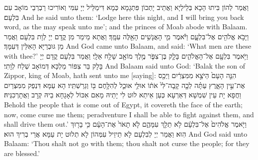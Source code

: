 {וַאֲמַר לְהוֹן בִּיתוּ הָכָא בְּלֵילְיָא וַאֲתֵיב יָתְכוֹן פִּתְגָמָא כְּמָא דִּימַלֵּיל יְיָ עִמִּי וְאוֹרִיכוּ רַבְרְבֵי מוֹאָב עִם בִּלְעָם׃}
{And he said unto them: ‘Lodge here this night, and I will bring you back word, as the \lord\space may speak unto me’; and the princes of Moab abode with Balaam.}{}
{וַיָּבֹ֥א אֱלֹהִ֖ים אֶל־בִּלְעָ֑ם וַיֹּ֕אמֶר מִ֛י הָאֲנָשִׁ֥ים הָאֵ֖לֶּה עִמָּֽךְ׃
}
{וַאֲתָא מֵימַר מִן קֳדָם יְיָ לְוָת בִּלְעָם וַאֲמַר מַן גּוּבְרַיָּא הָאִלֵּין דְּעִמָּךְ׃}
{And God came unto Balaam, and said: ‘What men are these with thee?’}{}
{וַיֹּ֥אמֶר בִּלְעָ֖ם אֶל־הָאֱלֹהִ֑ים בָּלָ֧ק בֶּן־צִפֹּ֛ר מֶ֥לֶךְ מוֹאָ֖ב שָׁלַ֥ח אֵלָֽי׃
}
{וַאֲמַר בִּלְעָם קֳדָם יְיָ בָּלָק בַּר צִפּוֹר מַלְכָּא דְּמוֹאָב שְׁלַח לְוָתִי׃}
{And Balaam said unto God: ‘Balak the son of Zippor, king of Moab, hath sent unto me [saying]:}{}
{הִנֵּ֤ה הָעָם֙ הַיֹּצֵ֣א מִמִּצְרַ֔יִם וַיְכַ֖ס אֶת־עֵ֣ין הָאָ֑רֶץ עַתָּ֗ה לְכָ֤ה קָֽבָה־לִּי֙ אֹת֔וֹ אוּלַ֥י אוּכַ֛ל לְהִלָּ֥חֶם בּ֖וֹ וְגֵרַשְׁתִּֽיו׃
}
{הָא עַמָּא דִּנְפַק מִמִּצְרַיִם וַחֲפָא יָת עֵין שִׁמְשָׁא דְּאַרְעָא כְּעַן אֵיתַא לוּט לִי יָתֵיהּ מָאִם אִכּוֹל לְאָגָחָא בֵיהּ קְרָב וַאֲתָרְכִנֵּיהּ׃}
{Behold the people that is come out of Egypt, it covereth the face of the earth; now, come curse me them; peradventure I shall be able to fight against them, and shall drive them out.’}{}
{וַיֹּ֤אמֶר אֱלֹהִים֙ אֶל־בִּלְעָ֔ם לֹ֥א תֵלֵ֖ךְ עִמָּהֶ֑ם לֹ֤א תָאֹר֙ אֶת־הָעָ֔ם כִּ֥י בָר֖וּךְ הֽוּא׃
}
{וַאֲמַר יְיָ לְבִלְעָם לָא תֵיזֵיל עִמְּהוֹן לָא תְלוּט יָת עַמָּא אֲרֵי בְרִיךְ הוּא׃}
{And God said unto Balaam: ‘Thou shalt not go with them; thou shalt not curse the people; for they are blessed.’}{}
